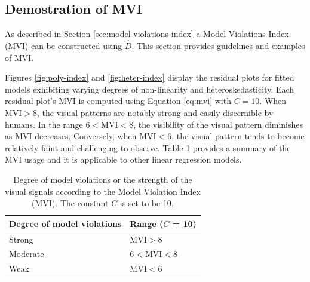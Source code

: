 \documentclass[]{interact}
\theoremstyle{plain}%
\theoremstyle{definition}
\theoremstyle{remark}
\begin{document}
\subsection{Demostration of MVI}\label{demostration-of-mvi}

As described in Section \ref{sec:model-violations-index} a Model
Violations Index (MVI) can be constructed using \(\hat{D}\). This
section provides guidelines and examples of MVI.

Figures \ref{fig:poly-index} and \ref{fig:heter-index} display the
residual plots for fitted models exhibiting varying degrees of
non-linearity and heteroskedasticity. Each residual plot's MVI is
computed using Equation \ref{eq:mvi} with \(C = 10\). When
\(\text{MVI} > 8\), the visual patterns are notably strong and easily
discernible by humans. In the range \(6 < \text{MVI} < 8\), the
visibility of the visual pattern diminishes as MVI decreases.
Conversely, when \(\text{MVI} < 6\), the visual pattern tends to become
relatively faint and challenging to observe. Table \ref{tab:mvi}
provides a summary of the MVI usage and it is applicable to other linear
regression models.

\begin{table}

\caption{\label{tab:mvi}Degree of model violations or the strength of the visual signals according to the Model Violation Index (MVI). The constant $C$ is set to be 10.}
\centering
\begin{tabular}[t]{ll}
\toprule
Degree of model violations & Range ($C$ = 10)\\
\midrule
Strong & $\text{MVI} > 8$\\
Moderate & $6 < \text{MVI} < 8$\\
Weak & $\text{MVI} < 6$\\
\bottomrule
\end{tabular}
\end{table}
\end{document}
